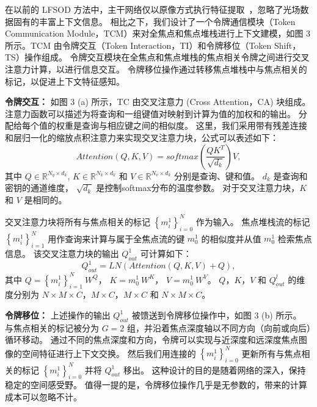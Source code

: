 %
%
%
%
在以前的 LFSOD 方法中，主干网络仅以原像方式执行特征提取~\cite{piao2020exploit, liu2021light}，忽略了光场数据固有的丰富上下文信息。 相比之下，我们设计了一个令牌通信模块（Token Communication Module，TCM）来对全焦点和焦点堆栈进行上下文建模，如图 3 所示。TCM 由令牌交互（Token Interaction，TI）和令牌移位（Token Shift，TS）操作组成。 
令牌交互模块在全焦点和焦点堆栈的焦点相关令牌之间进行交叉注意力计算，以进行信息交互。 
令牌移位操作通过转移焦点堆栈中与焦点相关的标记，以促进上下文特征感知。 
%
%
%
%
%
\par
\textbf{令牌交互：}
如图 3 (a) 所示，TC 由交叉注意力 (Cross Attention，CA) 块组成。 注意力函数可以描述为将查询和一组键值对映射到计算为值的加权和的输出。 分配给每个值的权重是查询与相应键之间的相似度。 这里，我们采用带有残差连接和层归一化的缩放点积注意力来实现交叉注意力块，公式可以表述如下：
%
%
%
\begin{equation}
	Attention(Q,K,V) = softmax \left ( \frac{QK^{T}}{\sqrt{d_{k}}} \right ) V,
\end{equation}
%
%
其中
$ Q \in \mathbb{R}^{N_{q}\times d_{k}}  $,
$ K \in \mathbb{R}^{N_{k}\times d_{k}}  $ 和
$ V \in \mathbb{R}^{N_{v}\times d_{k}}  $ 
分别是查询、键和值。 
$ d_{k} $ 是查询和密钥的通道维度，
$ \sqrt{d_{k}} $ 是控制softmax分布的温度参数。 
对于交叉注意力块，$K$ 和 $V$ 是相同的。 
%
%
%
%
%
\par
%
%
%
%
交叉注意力块将所有与焦点相关的标记 $ \left \{ m_{i}^{1} \right \}_{i=0}^{N} $ 作为输入。 焦点堆栈流的标记 $ \left \{  m_{i}^{1} \right \}_{i=1}^{N} $ 用作查询来计算与属于全焦点流的键 $ m_{0}^{1} $ 的相似度并从值 $ m_{0}^{1} $ 检索焦点信息。 该交叉注意力块的输出 $ Q_{out}^{1} $ 可计算如下：
%
%
\begin{equation}
	Q_{out}^{1} = LN \left ( Attention(Q,K,V) + Q \right ),
\end{equation}
%
%
其中
$ Q = \left \{ m_{i}^{1} \right \}_{i=1}^{N}~ W^{Q}$，
$ K= m_{0}^{1} ~W^{K} $，
$ V =  m_{0}^{1}~ W^{V} $。
$ Q$，$K$，$V$ 和 $ Q_{out}^{l} $
的维度分别为 
$ N \times M \times C $，$ M \times C $，$ M \times C $ 
和
 $ N \times M \times C $。 
%
%
%
\par
%
%
%
\textbf{令牌移位：}
%
%
上述操作的输出 $ Q_{out}^{1} $ 被馈送到令牌移位操作中，如图 3 (b) 所示。 与焦点相关的标记被分为 $G = 2$ 组，并沿着焦点深度轴以不同方向（向前或向后）循环移动。 
通过不同的焦点深度和方向，令牌可以实现与近深度和远深度焦点图像的空间特征进行上下文交换。 
然后我们用连接的 $ \left \{ m_{i}^{1} \right \}_{i=0}^{N} $ 更新所有与焦点相关的标记  $ \left \{ m_{i}^{1} \right \}_{i=0}^{N} $ 并将 
$ Q_{out}^{1} $ 移出。 这种设计的目的是随着网络的深入，保持稳定的空间感受野。 值得一提的是，令牌移位操作几乎是无参数的，带来的计算成本可以忽略不计。


